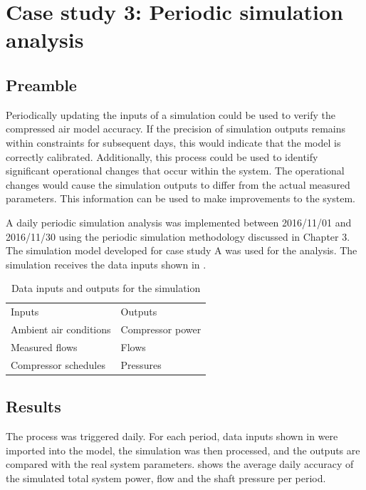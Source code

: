 \section{Case study 3: Periodic simulation analysis}
	\subsection{Preamble}
	Periodically updating the inputs of a simulation could be used to verify the compressed air model accuracy. If the precision of simulation outputs remains within constraints for subsequent days, this would indicate that the model is correctly calibrated. Additionally, this process could be used to identify significant operational changes that occur within the system. The operational changes would cause the simulation outputs to differ from the actual measured parameters. This information can be used to make improvements to the system.
	\par 
	A daily periodic simulation analysis was implemented between 2016/11/01 and 2016/11/30 using the periodic simulation methodology discussed in Chapter 3. The simulation model developed for case study A was used for the analysis. The simulation receives the data inputs shown in .
	\begin{table}[h!]
		\centering
		\begin{tabular}{ll}
			\hline
			Inputs \hspace*{4cm} &Outputs \hspace*{4cm} \\ \hhline{==}
			Ambient air conditions&Compressor power \\
			Measured flows& Flows \\
			Compressor schedules& Pressures \\
			\hline
		\end{tabular}
		\caption{Data inputs and outputs for the simulation}
		\label{table: Periodic inputs/outputs}
	\end{table}

\subsection{Results}

 The process was triggered daily. For each period, data inputs shown in  were imported into the model, the simulation was then processed, and the outputs are compared with the real system parameters.  shows the average daily accuracy of the simulated total system power, flow and the shaft pressure per period.
	 \par 
 
